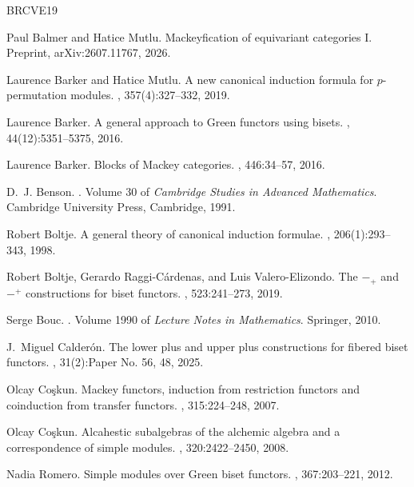 \documentclass{amsart}
\numberwithin{equation}{section}%
\theoremstyle{remark}
\theoremstyle{definition}
\begin{document}
\begin{thebibliography}{BRCVE19}

Paul Balmer and Hatice Mutlu.
\newblock Mackeyfication of equivariant categories {I}.
\newblock Preprint, arXiv:2607.11767, 2026.

Laurence Barker and Hatice Mutlu.
\newblock A new canonical induction formula for {$p$}-permutation modules.
, 357(4):327--332, 2019.

Laurence Barker.
\newblock A general approach to {G}reen functors using bisets.
, 44(12):5351--5375, 2016.

Laurence Barker.
\newblock Blocks of {M}ackey categories.
, 446:34--57, 2016.

D.~J. Benson.
.
\newblock Volume 30 of {\em Cambridge Studies in Advanced Mathematics}.
Cambridge University Press, Cambridge, 1991.

Robert Boltje.
\newblock A general theory of canonical induction formulae.
, 206(1):293--343, 1998.

Robert Boltje, Gerardo Raggi-C\'ardenas, and Luis Valero-Elizondo.
\newblock The {$-_+$} and {$-^+$} constructions for biset functors.
, 523:241--273, 2019.

Serge Bouc.
.
\newblock Volume 1990 of {\em Lecture Notes in Mathematics}.
Springer, 2010.

J.~Miguel Calder\'on.
\newblock The lower plus and upper plus constructions for fibered biset
functors.
, 31(2):Paper No. 56, 48, 2025.

Olcay Co{\c{s}}kun.
\newblock Mackey functors, induction from restriction functors and
coinduction from transfer functors.
, 315:224--248, 2007.

Olcay Co{\c{s}}kun.
\newblock Alcahestic subalgebras of the alchemic algebra and
a correspondence of simple modules.
, 320:2422--2450, 2008.

Nadia Romero.
\newblock Simple modules over {G}reen biset functors.
, 367:203--221, 2012.

\end{thebibliography}
\end{document}
